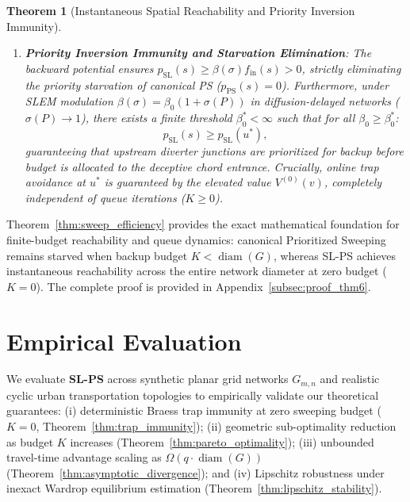 \documentclass[11pt,a4paper]{article}
\newtheorem{theorem}{Theorem}
\begin{document}
\begin{theorem}[Instantaneous Spatial Reachability and Priority Inversion Immunity]
\begin{enumerate}
    \item \textbf{Priority Inversion Immunity and Starvation Elimination}: The backward potential ensures $p_{\text{SL}}(s) \ge \beta(\sigma) f_{\text{in}}(s) > 0$, strictly eliminating the priority starvation of canonical PS ($p_{\text{PS}}(s) = 0$). Furthermore, under SLEM modulation $\beta(\sigma) = \beta_0 (1 + \sigma(P))$ in diffusion-delayed networks ($\sigma(P) \to 1$), there exists a finite threshold $\beta_0^* < \infty$ such that for all $\beta_0 \ge \beta_0^*$:
    \begin{equation}
    \label{eq:priority_order_slps}
    p_{\text{SL}}(s) \ge p_{\text{SL}}(u^*),
    \end{equation}
    guaranteeing that upstream diverter junctions are prioritized for backup before budget is allocated to the deceptive chord entrance. Crucially, online trap avoidance at $u^*$ is guaranteed by the elevated value $V^{(0)}(v)$, completely independent of queue iterations ($K \ge 0$).
\end{enumerate}
\end{theorem}

Theorem~\ref{thm:sweep_efficiency} provides the exact mathematical foundation for finite-budget reachability and queue dynamics: canonical Prioritized Sweeping remains starved when backup budget $K < \operatorname{diam}(G)$, whereas SL-PS achieves instantaneous reachability across the entire network diameter at zero budget ($K = 0$). The complete proof is provided in Appendix~\ref{subsec:proof_thm6}.

\section{Empirical Evaluation}
\label{sec:experiments}

We evaluate \textbf{SL-PS} across synthetic planar grid networks $G_{m,n}$ and realistic cyclic urban transportation topologies to empirically validate our theoretical guarantees: (i) deterministic Braess trap immunity at zero sweeping budget ($K=0$, Theorem~\ref{thm:trap_immunity}); (ii) geometric sub-optimality reduction as budget $K$ increases (Theorem~\ref{thm:pareto_optimality}); (iii) unbounded travel-time advantage scaling as $\Omega(q \cdot \operatorname{diam}(G))$ (Theorem~\ref{thm:asymptotic_divergence}); and (iv) Lipschitz robustness under inexact Wardrop equilibrium estimation (Theorem~\ref{thm:lipschitz_stability}).
\end{document}
